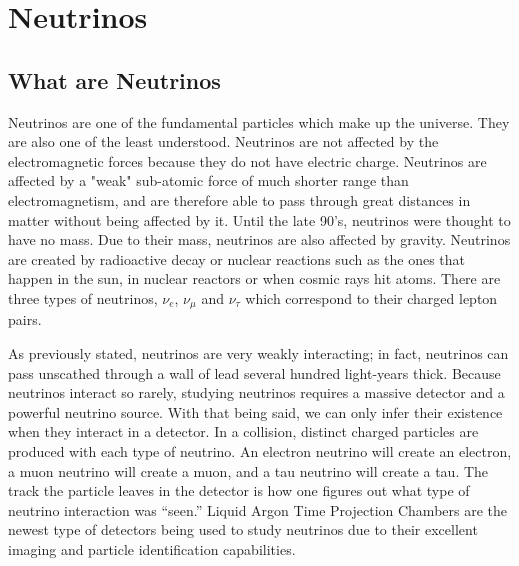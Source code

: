 \chapter{Neutrinos}

\section{What are Neutrinos}
Neutrinos are one of the fundamental particles which make up the universe. They are also one of the least understood. Neutrinos are not affected by the electromagnetic forces because they do not have electric charge. Neutrinos are affected by a "weak" sub-atomic force of much shorter range than electromagnetism, and are therefore able to pass through great distances in matter without being affected by it. Until the late 90's, neutrinos were thought to have no mass. Due to their mass, neutrinos are also affected by gravity. Neutrinos are created by radioactive decay or nuclear reactions such as the ones that happen in the sun, in nuclear reactors or when cosmic rays hit atoms. There are three types of neutrinos, $\nu_{e}$, $\nu_{\mu}$ and $\nu_{\tau}$ which correspond to their charged lepton pairs.  

As previously stated, neutrinos are very weakly interacting; in fact, neutrinos can pass unscathed through a wall of lead several hundred light-years thick. Because neutrinos interact so rarely, studying neutrinos requires a massive detector and a powerful neutrino source. With that being said, we can only infer their existence when they interact in a detector. In a collision, distinct charged particles are produced with each type of neutrino. An electron neutrino will create an electron, a muon neutrino will create a muon, and a tau neutrino will create a tau. The track the particle leaves in the detector is how one figures out what type of neutrino interaction was “seen.” Liquid Argon Time Projection Chambers are the newest type of detectors being used to study neutrinos due to their excellent imaging and particle identification capabilities. 

